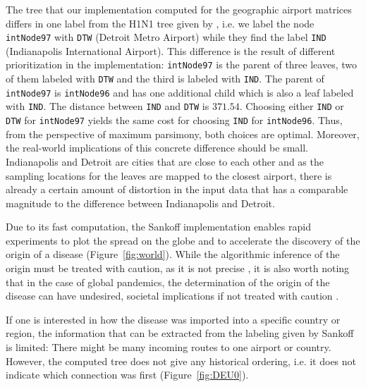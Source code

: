\documentclass{article}
\begin{document}
The tree that our implementation computed for the geographic airport matrices
differs in one label from the H1N1 tree given by
\cite{reimeringPhylogeographicReconstructionUsing2020}, i.e. we label the node
\texttt{intNode97} with \texttt{DTW} (Detroit Metro Airport) while they find the label
\texttt{IND} (Indianapolis International Airport).
This difference is the result of different prioritization in the implementation:
\texttt{intNode97} is the parent of three leaves, two of them labeled with
\texttt{DTW} and the third is labeled with \texttt{IND}. The parent of
\texttt{intNode97} is \texttt{intNode96} and has one additional child which is
also a leaf labeled with \texttt{IND}. The distance between \texttt{IND}
and \texttt{DTW} is $371.54$. Choosing either \texttt{IND} or \texttt{DTW} for
\texttt{intNode97} yields the same cost for choosing \texttt{IND} for
\texttt{intNode96}. Thus, from the perspective of maximum parsimony, both
choices are optimal. Moreover, the real-world implications of this concrete
difference should be small. Indianapolis and Detroit are cities that are close
to each other and as the sampling locations for the leaves are mapped to the
closest airport, there is already a certain amount of distortion
 in the input data that has a comparable magnitude to
the difference between Indianapolis and Detroit.

Due to its fast computation, the Sankoff implementation enables rapid
experiments to plot the spread on the globe and to accelerate the discovery 
of the origin of a disease
(Figure~\ref{fig:world}). While the algorithmic inference of the origin must be
treated with caution, as it is not precise
\cite{reimeringPhylogeographicReconstructionUsing2020}, it is also worth noting
that in the case of global pandemics, the determination of the origin of the
disease can have undesired, societal implications if not treated with caution
\cite{chenPotentialImpactCOVID192020}.

If one is interested in how the disease was imported into a specific country or
region, the information that can be extracted from the labeling given by Sankoff
is limited: There might be many incoming routes to one airport or country. However,
the computed tree does not give any historical ordering, i.e. it does not
indicate which connection was first (Figure~\ref{fig:DEU0}).
\end{document}
